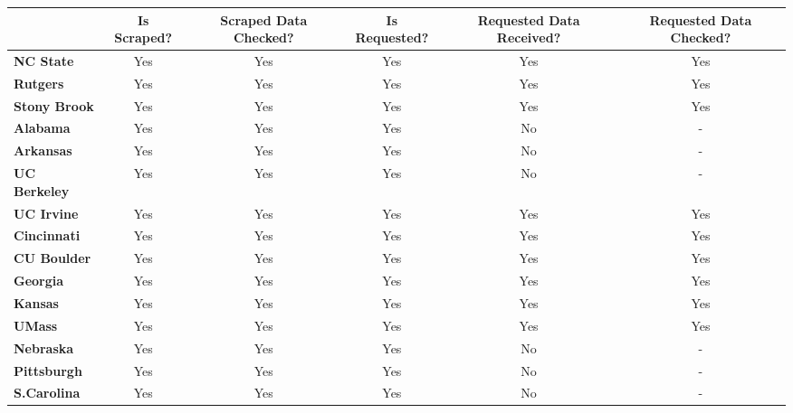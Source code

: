 \begin{tabular*}{\textwidth}{@{\extracolsep{\fill} } lccccc}%
\textbf{}&\textbf{Is Scraped?}&\textbf{Scraped Data Checked?}&\textbf{Is Requested?}&\textbf{Requested Data Received?}&\textbf{Requested Data Checked?}\\%
\hline%
\bfseries NC State&Yes&Yes&Yes&Yes&Yes\\%
\bfseries Rutgers&Yes&Yes&Yes&Yes&Yes\\%
\bfseries Stony Brook&Yes&Yes&Yes&Yes&Yes\\%
\bfseries Alabama&Yes&Yes&Yes&No&{-}\\%
\bfseries Arkansas&Yes&Yes&Yes&No&{-}\\%
\bfseries UC Berkeley&Yes&Yes&Yes&No&{-}\\%
\bfseries UC Irvine&Yes&Yes&Yes&Yes&Yes\\%
\bfseries Cincinnati&Yes&Yes&Yes&Yes&Yes\\%
\bfseries CU Boulder&Yes&Yes&Yes&Yes&Yes\\%
\bfseries Georgia&Yes&Yes&Yes&Yes&Yes\\%
\bfseries Kansas&Yes&Yes&Yes&Yes&Yes\\%
\bfseries UMass&Yes&Yes&Yes&Yes&Yes\\%
\bfseries Nebraska&Yes&Yes&Yes&No&{-}\\%
\bfseries Pittsburgh&Yes&Yes&Yes&No&{-}\\%
\bfseries S.Carolina&Yes&Yes&Yes&No&{-}\\%
\hline%
\end{tabular*}